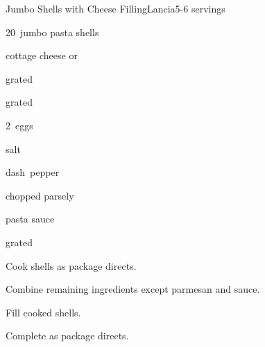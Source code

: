 \begin{recipe}{Jumbo Shells with Cheese Filling}{Lancia}{5-6 servings}

\begin{ingredients}
\item 20~jumbo pasta shells
\item {} cottage cheese or 
\item \C{1\half} grated 
\item \C{1\half} grated 
\item 2~eggs
\item \tp{\half} salt
\item dash~pepper
\item {} chopped parsely
\item \C{3\half} pasta sauce
\item \C{\quarter} grated 
\end{ingredients}

\begin{directions}
\item Cook shells as package directs.
\item Combine remaining ingredients except parmesan and sauce.
\item Fill cooked shells.
\item Complete as package directs.
\end{directions}

\end{recipe}
